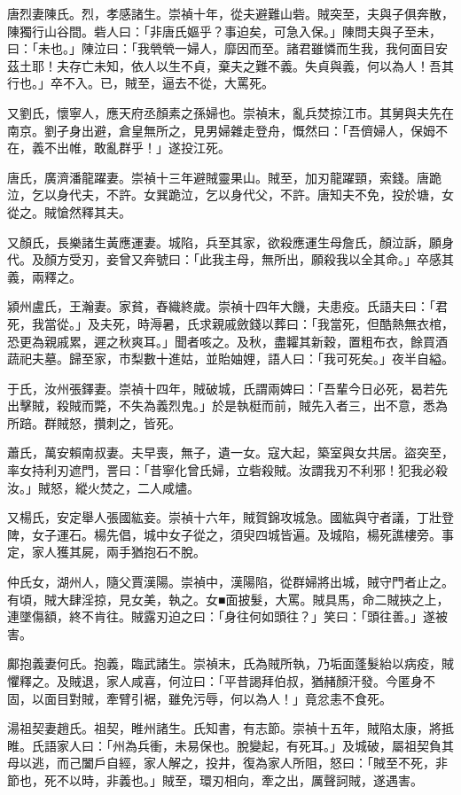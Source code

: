 \begin{pinyinscope}
唐烈妻陳氏。烈，孝感諸生。崇禎十年，從夫避難山砦。賊突至，夫與子俱奔散，陳獨行山谷間。砦人曰：「非唐氏嫗乎？事迫矣，可急入保。」陳問夫與子至未，曰：「未也。」陳泣曰：「我煢煢一婦人，靡因而至。諸君雖憐而生我，我何面目安茲土耶！夫存亡未知，依人以生不貞，棄夫之難不義。失貞與義，何以為人！吾其行也。」卒不入。已，賊至，逼去不從，大罵死。

又劉氏，懷寧人，應天府丞顏素之孫婦也。崇禎末，亂兵焚掠江市。其舅與夫先在南京。劉孑身出避，倉皇無所之，見男婦雜走登舟，慨然曰：「吾儕婦人，保姆不在，義不出帷，敢亂群乎！」遂投江死。

唐氏，廣濟潘龍躍妻。崇禎十三年避賊靈果山。賊至，加刃龍躍頸，索錢。唐跪泣，乞以身代夫，不許。女巽跪泣，乞以身代父，不許。唐知夫不免，投於塘，女從之。賊愴然釋其夫。

又顏氏，長樂諸生黃應運妻。城陷，兵至其家，欲殺應運生母詹氏，顏泣訴，願身代。及顏方受刃，妾曾又奔號曰：「此我主母，無所出，願殺我以全其命。」卒感其義，兩釋之。

潁州盧氏，王瀚妻。家貧，舂織終歲。崇禎十四年大饑，夫患疫。氏語夫曰：「君死，我當從。」及夫死，時溽暑，氏求親戚斂錢以葬曰：「我當死，但酷熱無衣棺，恐更為親戚累，遲之秋爽耳。」聞者咳之。及秋，盡糶其新穀，置粗布衣，餘買酒蔬祀夫墓。歸至家，市梨數十進姑，並貽妯娌，語人曰：「我可死矣。」夜半自縊。

于氏，汝州張鐸妻。崇禎十四年，賊破城，氏謂兩婢曰：「吾輩今日必死，曷若先出擊賊，殺賊而斃，不失為義烈鬼。」於是執梃而前，賊先入者三，出不意，悉為所踣。群賊怒，攢刺之，皆死。

蕭氏，萬安賴南叔妻。夫早喪，無子，遺一女。寇大起，築室與女共居。盜突至，率女持利刃遮門，詈曰：「昔寧化曾氏婦，立砦殺賊。汝謂我刃不利邪！犯我必殺汝。」賊怒，縱火焚之，二人咸燼。

又楊氏，安定舉人張國紘妾。崇禎十六年，賊賀錦攻城急。國紘與守者議，丁壯登陴，女子運石。楊先倡，城中女子從之，須臾四城皆遍。及城陷，楊死譙樓旁。事定，家人獲其屍，兩手猶抱石不脫。

仲氏女，湖州人，隨父賈漢陽。崇禎中，漢陽陷，從群婦將出城，賊守門者止之。有頃，賊大肆淫掠，見女美，執之。女■面披髮，大罵。賊具馬，命二賊挾之上，連墜傷額，終不肯往。賊露刃迫之曰：「身往何如頭往？」笑曰：「頭往善。」遂被害。

鄺抱義妻何氏。抱義，臨武諸生。崇禎末，氏為賊所執，乃垢面蓬髮紿以病疫，賊懼釋之。及賊退，家人咸喜，何泣曰：「平昔謁拜伯叔，猶赭顏汗發。今匿身不固，以面目對賊，牽臂引裾，雖免污辱，何以為人！」竟忿恚不食死。

湯祖契妻趙氏。祖契，睢州諸生。氏知書，有志節。崇禎十五年，賊陷太康，將抵睢。氏語家人曰：「州為兵衝，未易保也。脫變起，有死耳。」及城破，屬祖契負其母以逃，而己闔戶自經，家人解之，投井，復為家人所阻，怒曰：「賊至不死，非節也，死不以時，非義也。」賊至，環刃相向，牽之出，厲聲訶賊，遂遇害。


\end{pinyinscope}

